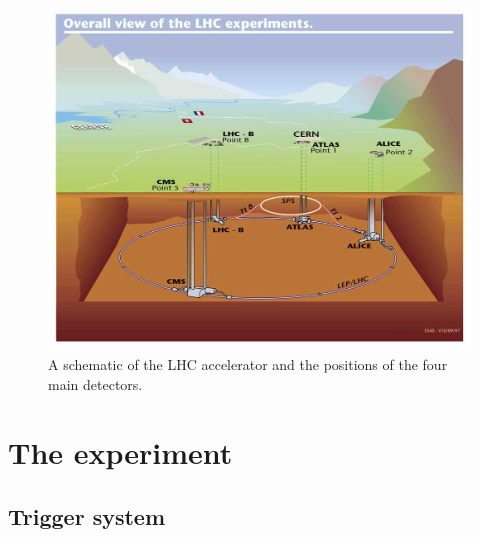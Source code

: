 \begin{figure}
  \includegraphics[width=\largefigwidth]{plots/detector/lhc_layout_sch.jpg}
  \caption{A schematic of the LHC accelerator and the positions of the four main detectors.}
  \label{fig:lhclayout}
\end{figure}



\section{The \CMS experiment}
\label{sec:CMSInDetail}


\subsection{Trigger system}
\label{sec:triggers}


